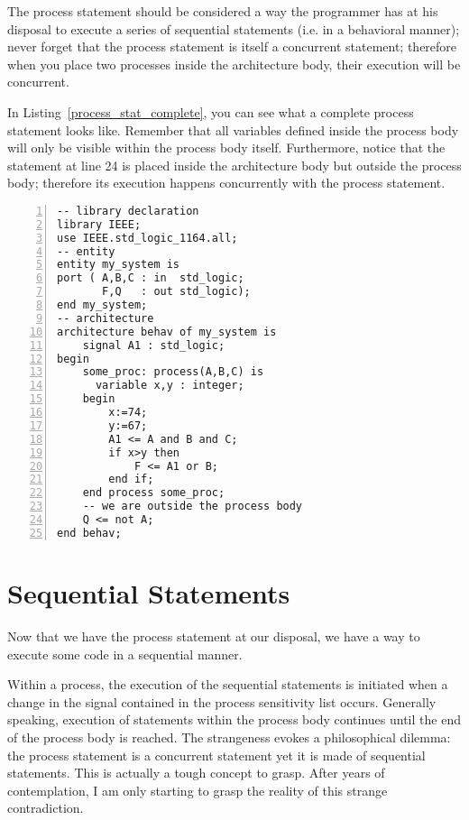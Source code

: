 The process statement should be considered a way the programmer has at his disposal to execute a series of sequential statements (i.e. in a behavioral manner); never forget that the process statement is itself a concurrent statement; therefore when you place two processes inside the architecture body, their execution will be concurrent.

In Listing~\ref{process_stat_complete}, you can see what a complete process statement looks like. Remember that all variables defined inside the process body will only be visible within the process body itself. Furthermore, notice that the statement at line 24 is placed inside the architecture body but outside the process body; therefore its execution happens concurrently with the process statement.

\begin{lstlisting}[float, numbers=left,label=process_stat_complete, caption=Use of the process statement.]
-- library declaration
library IEEE;
use IEEE.std_logic_1164.all;
-- entity
entity my_system is
port ( A,B,C : in  std_logic;
       F,Q   : out std_logic);
end my_system;
-- architecture
architecture behav of my_system is
	signal A1 : std_logic;
begin
	some_proc: process(A,B,C) is
	  variable x,y : integer;
	begin
		x:=74;
		y:=67;
		A1 <= A and B and C;
		if x>y then
            F <= A1 or B;
		end if;
	end process some_proc;
	-- we are outside the process body
	Q <= not A;
end behav;
\end{lstlisting}

\section{Sequential Statements}
Now that we have the process statement at our disposal, we have a way to execute some code in a sequential manner.

Within a process, the execution of the sequential statements is initiated when a change in the signal contained in the process sensitivity list occurs. Generally speaking, execution of statements within the process body continues until the end of the process body is reached. The strangeness evokes a philosophical dilemma: the process statement is a concurrent statement yet it is made of sequential statements. This is actually a tough concept to grasp. After years of contemplation, I am only starting to grasp the reality of this strange contradiction.

